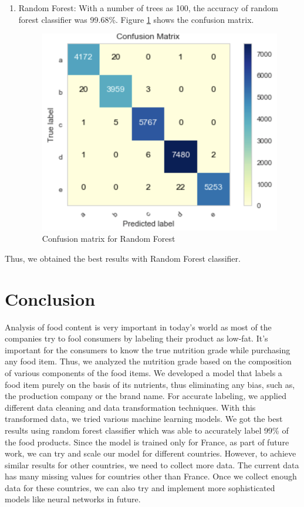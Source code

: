 \documentclass[sigconf]{acmart}
\begin{document}
\begin{enumerate}
  \item Random Forest: With a number of trees as 100, the accuracy of random forest classifier was 99.68\%. Figure \ref{fig:Fig6} shows the confusion matrix. \\

\begin{figure}
\includegraphics[width=1.0\columnwidth]{images/fig6.png}
\caption{Confusion matrix for Random Forest \cite{code-base}}
\label{fig:Fig6}
\end{figure}

\end{enumerate}

Thus, we obtained the best results with Random Forest classifier.

\section{Conclusion}
Analysis of food content is very important in today's world as most of the companies try to fool consumers by labeling their product as low-fat. It's important for the consumers to know the true nutrition grade while purchasing any food item. Thus, we analyzed the nutrition grade based on the composition of various components of the food items. We developed a model that labels a food item purely on the basis of its nutrients, thus eliminating any bias, such as, the production company or the brand name. For accurate labeling, we applied different data cleaning and data transformation techniques. With this transformed data, we tried various machine learning models. We got the best results using random forest classifier which was able to accurately label 99\% of the food products. Since the model is trained only for France, as part of future work, we can try and scale our model for different countries. However, to achieve similar results for other countries, we need to collect more data. The current data has many missing values for countries other than France. Once we collect enough data for these countries, we can also try and implement more sophisticated models like neural networks in future.
\end{document}
